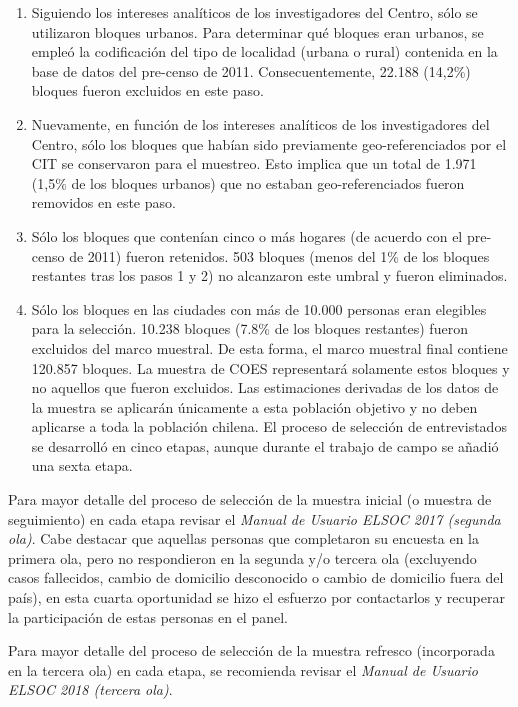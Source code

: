 \documentclass[
]{book}
\begin{document}
\begin{enumerate}
\def\labelenumi{\arabic{enumi}.}
\item
  Siguiendo los intereses analíticos de los investigadores del Centro, sólo se utilizaron bloques urbanos. Para determinar qué bloques eran urbanos, se empleó la codificación del tipo de localidad (urbana o rural) contenida en la base de datos del pre-censo de 2011. Consecuentemente, 22.188 (14,2\%) bloques fueron excluidos en este paso.
\item
  Nuevamente, en función de los intereses analíticos de los investigadores del Centro, sólo los bloques que habían sido previamente geo-referenciados por el CIT se conservaron para el muestreo. Esto implica que un total de 1.971 (1,5\% de los bloques urbanos) que no estaban geo-referenciados fueron removidos en este paso.
\item
  Sólo los bloques que contenían cinco o más hogares (de acuerdo con el pre-censo de 2011) fueron retenidos. 503 bloques (menos del 1\% de los bloques restantes tras los pasos 1 y 2) no alcanzaron este umbral y fueron eliminados.
\item
  Sólo los bloques en las ciudades con más de 10.000 personas eran elegibles para la selección. 10.238 bloques (7.8\% de los bloques restantes) fueron excluidos del marco muestral.
  De esta forma, el marco muestral final contiene 120.857 bloques. La muestra de COES representará solamente estos bloques y no aquellos que fueron excluidos. Las estimaciones derivadas de los datos de la muestra se aplicarán únicamente a esta población objetivo y no deben aplicarse a toda la población chilena. El proceso de selección de entrevistados se desarrolló en cinco etapas, aunque durante el trabajo de campo se añadió una sexta etapa.
\end{enumerate}

Para mayor detalle del proceso de selección de la muestra inicial (o muestra de seguimiento) en cada etapa revisar el \emph{Manual de Usuario ELSOC 2017 (segunda ola)}. Cabe destacar que aquellas personas que completaron su encuesta en la primera ola, pero no respondieron en la segunda y/o tercera ola (excluyendo casos fallecidos, cambio de domicilio desconocido o cambio de domicilio fuera del país), en esta cuarta oportunidad se hizo el esfuerzo por contactarlos y recuperar la participación de estas personas en el panel.

Para mayor detalle del proceso de selección de la muestra refresco (incorporada en la tercera ola) en cada etapa, se recomienda revisar el \emph{Manual de Usuario ELSOC 2018 (tercera ola)}.
\end{document}
